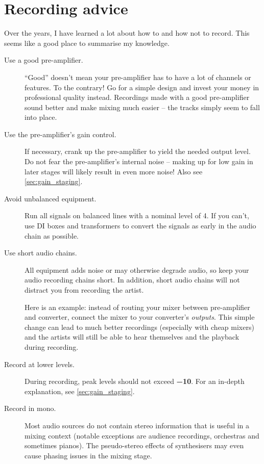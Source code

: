 \chapter{Recording advice}
\label{chap:recording_advice}

Over the years, I have learned a lot about how to and how not to
record.  This seems like a good place to summarise my knowledge.

\begin{description}

\item[Use a good pre-amplifier.]  ``Good'' doesn't mean your
  pre-amplifier has to have a lot of channels or features.  To the
  contrary!  Go for a simple design and invest your money in
  professional quality instead.  Recordings made with a good
  pre-amplifier sound better and make mixing much easier -- the tracks
  simply seem to fall into place.

\item[ Use the pre-amplifier's gain control.]  If necessary, crank up
  the pre-amplifier to yield the needed output level.  Do not fear the
  pre-amplifier's internal noise -- making up for low gain in later
  stages will likely result in even more noise!  Also see
  \ref{sec:gain_staging}.

\item[Avoid unbalanced equipment.]  Run all signals on balanced lines
  with a nominal level of \SI[retain-explicit-plus]{+4}{\dBu}.  If you
  can't, use DI boxes and transformers to convert the signals as early
  in the audio chain as possible.

\item[Use short audio chains.]  All equipment adds noise or may
  otherwise degrade audio, so keep your audio recording chains short.
  In addition, short audio chains will not distract you from recording
  the artist.

  Here is an example: instead of routing your mixer between
  pre-amplifier and converter, connect the mixer to your converter's
  \emph{outputs}.  This simple change can lead to much better
  recordings (especially with cheap mixers) and the artists will still
  be able to hear themselves and the playback during recording.

\item[Record at lower levels.]  During recording, peak levels should
  not exceed \textbf{\SI{-10}{\dBFS}}.  For an in-depth explanation,
  see \ref{sec:gain_staging}.

\item[Record in mono.]  Most audio sources do not contain stereo
  information that is useful in a mixing context (notable exceptions
  are audience recordings, orchestras and sometimes pianos).  The
  pseudo-stereo effects of synthesisers may even cause phasing issues
  in the mixing stage.


\end{description}
